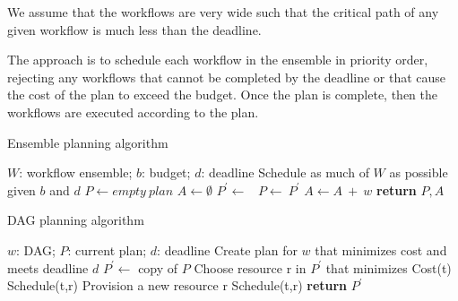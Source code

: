 \documentclass{sig-alternate}
\begin{document}
We assume that the workflows are very wide such that the critical path of any given workflow is much less than the deadline.

The approach is to schedule each workflow in the ensemble in priority order, rejecting any workflows that cannot be completed by the deadline or that cause the cost of the plan to exceed the budget. Once the plan is complete, then the workflows are executed according to the plan.

\begin{algorithm}
\caption{Ensemble planning algorithm}
\label{alg:admit}
\begin{algorithmic}[1]
\Require $W$: workflow ensemble; $b$: budget; $d$: deadline
\Ensure Schedule as much of $W$ as possible given $b$ and $d$
    \State $P\gets empty\ plan$
    \State $A\gets \emptyset$ 
        \State $P^\prime \gets$\ 
                \State $P\gets\ P^\prime$ 
                \State $A \gets A\ +\ w$ 
            \EndIf
        \EndIf
    \EndFor
    \State \textbf{return} $P,A$
\EndProcedure
\end{algorithmic} 
\end{algorithm}


\begin{algorithm}
\caption{DAG planning algorithm}
\label{alg:plandag}
\begin{algorithmic}[1]
\Require $w$: DAG; $P$: current plan; $d$: deadline
\Ensure Create plan for $w$ that minimizes cost and meets deadline $d$
    \State $P^\prime\gets$ copy of $P$
    \State {}
        \State Choose resource r in $P^\prime$ that minimizes Cost(t)
            \State Schedule(t,r)
        \Else
            \State Provision a new resource r
            \State Schedule(t,r)
        \EndIf
    \EndFor
    \State \textbf{return} $P^\prime$
\EndProcedure
\end{algorithmic} 
\end{algorithm}
\end{document}
